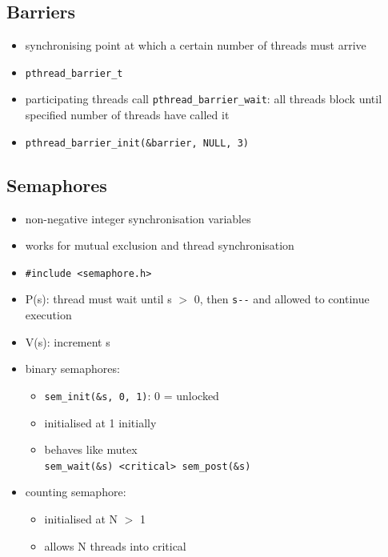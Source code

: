 \documentclass[10pt, multicolumn, a4paper]{article}
\begin{document}
\begin{multicols}{2}
	\subsection*{Barriers}
	\begin{itemize}
	\item synchronising point at which a certain number of threads must arrive 
	\item \verb|pthread_barrier_t|
	\item participating threads call \verb|pthread_barrier_wait|: all threads block until specified number of threads have called it
	\item \verb|pthread_barrier_init(&barrier, NULL, 3)|
	\end{itemize}
	\subsection*{Semaphores}
	\begin{itemize}
	\item non-negative integer synchronisation variables
	\item works for mutual exclusion and thread synchronisation
	\item \verb|#include <semaphore.h>|
	\item P(s): thread must wait until s $>$ 0, then \verb|s--| and allowed to continue execution 
	\item V(s): increment s
	\item binary semaphores: 
		\begin{itemize}
		\item \verb|sem_init(&s, 0, 1)|: 0 = unlocked
		\item initialised at 1 initially
		\item behaves like mutex \\ \verb|sem_wait(&s) <critical> sem_post(&s)|
		\end{itemize}
	\item counting semaphore:
		\begin{itemize}
		\item initialised at N $>$ 1
		\item allows N threads into critical
		\end{itemize}
	\end{itemize}

\end{multicols}
\end{document}
